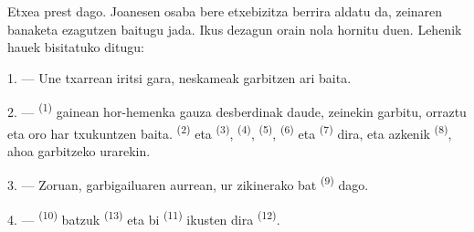 %
%
%

\VUsaut{6.0mm}
\VUsaut{1.4mm}
\VUsaut{0.4mm}
\VUsaut{2.2mm}

Etxea prest dago. Joanesen osaba bere etxebizitza berrira aldatu da, zeinaren
banaketa ezagutzen baitugu jada. Ikus dezagun orain nola hornitu duen. Lehenik
hauek bisitatuko ditugu:

\VUsaut{3.0mm}

1. --- Une txarrean iritsi gara, neskameak  garbitzen ari baita.

2. ---  \textsuperscript{(1)} gainean hor-hemenka gauza
desberdinak daude, zeinekin garbitu, orraztu eta oro har txukuntzen baita.
 \textsuperscript{(2)} eta 
\textsuperscript{(3)},  \textsuperscript{(4)},
 \textsuperscript{(5)},  \textsuperscript{(6)} eta
 \textsuperscript{(7)} dira, eta azkenik 
\textsuperscript{(8)}, ahoa garbitzeko urarekin.

3. --- Zoruan, garbigailuaren aurrean, ur zikinerako  bat
\textsuperscript{(9)} dago.

4. ---  \textsuperscript{(10)}  batzuk
\textsuperscript{(13)} eta bi  \textsuperscript{(11)} ikusten dira
 \textsuperscript{(12)}.

